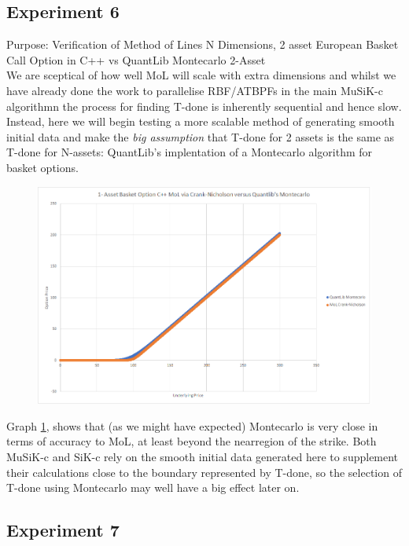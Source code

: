 \documentclass[a4paper]{amsart}
\begin{document}
\subsection{Experiment 6}\label{cppExp6}

Purpose: Verification of Method of Lines N Dimensions, 2 asset European Basket Call Option in C++ vs QuantLib Montecarlo 2-Asset\\

We are sceptical of how well MoL will scale with extra dimensions and whilst we have already done the work to parallelise RBF/ATBPFs in the main MuSiK-c algorithmn the process for finding T-done is inherently sequential and hence slow. Instead, here we will begin testing a more scalable method of generating smooth initial data and make the \emph{big assumption} that T-done for 2 assets is the same as T-done for N-assets: QuantLib's\cite{ql} implentation of a Montecarlo algorithm for basket options.

\begin{figure}[h]
\centering
\includegraphics[scale=0.3]{cppExp6-chart.png}
\caption {}
\label {fig:cppExp6}
\end{figure}

Graph \ref{fig:cppExp6}, shows that (as we might have expected) Montecarlo is very close in terms of accuracy to MoL, at least beyond the nearregion of the strike. Both MuSiK-c and SiK-c rely on the smooth initial data generated here to supplement their calculations close to the boundary represented by T-done, so the selection of T-done using Montecarlo may well have a big effect later on.

\subsection{Experiment 7}\label{cppExp7}
\end{document}
